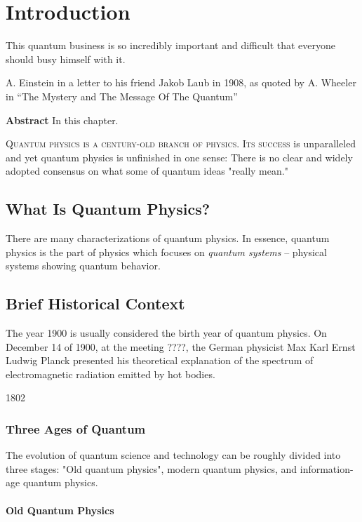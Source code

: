 \graphicspath{{../01Introduction/pics/}}

\chapter{Introduction}\label{ch:Introduction}

\begin{quoting}
	This quantum business is so incredibly important and difficult that everyone should busy himself with it. 
	
	
	A. Einstein in a letter to his friend Jakob Laub in 1908, as quoted by A. Wheeler in “The Mystery and The Message Of The Quantum”
\end{quoting}

{\bf Abstract}\hspace{0.2cm} In this chapter.


\lettrine[lines=2]{\color{darkocre}Q}{uantum physics is a century-old branch of physics. Its success} is unparalleled and yet quantum physics is unfinished in one sense: There is no clear and widely adopted consensus on what some of quantum ideas "really mean."

\section{What Is Quantum Physics?}
There are many characterizations of quantum physics.  In essence, quantum physics is the part of physics which focuses on \emph{quantum systems} -- physical systems showing quantum behavior.


\section{Brief Historical Context}
The year 1900 is usually considered the birth year of quantum physics. On December 14 of 1900, at the meeting ????, the German physicist Max Karl Ernst Ludwig Planck presented his theoretical explanation of the spectrum of electromagnetic radiation emitted by hot bodies.  

1802 
\subsection{Three Ages of Quantum}
The evolution of quantum science and technology can be roughly divided into three stages: "Old quantum physics", modern quantum physics, and information-age quantum physics.

\subsubsection*{Old Quantum Physics}


